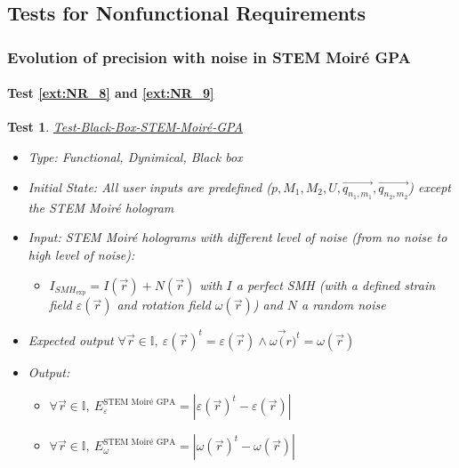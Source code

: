 \documentclass[12pt, titlepage]{article}
\newcommand{\progname}{STEM Moir{\'e} GPA}
\newtheorem{Test}{Test}
\begin{document}
\subsection{Tests for Nonfunctional Requirements}

\subsubsection{Evolution of precision with noise in \progname{}}
		
\paragraph{Test \cref{ext:NR_8} and \cref{ext:NR_9}}						

\begin{Test}\normalfont\underline{Test-Black-Box-STEM-Moir{\'e}-GPA}
\label{black_box_STEM_Moire_GPA}
\begin{itemize}
\item Type: Functional, Dynimical, Black box
\item Initial State: All user inputs are predefined ($p,M_1,M_2,U,\overrightarrow{q_{n_1,m_1}},\overrightarrow{q_{n_2,m_2}}$) except the STEM Moir{\'e} hologram
\item Input: STEM Moir{\'e} holograms with different level of noise (from no noise to high level of noise): 
	\begin{itemize}
	\item	$I_{\mathit{SMH}_\text{exp}} = I(\vec{r}) + N(\vec{r})$ with $I$ a perfect SMH (with a defined strain field $\varepsilon(\vec{r})$ and rotation field $\omega(\vec{r})$) and $N$ a random noise
	\end{itemize}
\item Expected output $\forall \vec{r} \in \mathbb{I}, \ \varepsilon(\vec{r})^{t}=\varepsilon(\vec{r}) \wedge \omega\vec({r})^{t}=\omega(\vec{r})$
\item Output:
	\begin{itemize}
	\item $\forall \vec{r} \in \mathbb{I}, \ E^{\text{\progname{}}}_{\varepsilon}=|\varepsilon(\vec{r})^{t}-\varepsilon(\vec{r})|$
	\item $\forall \vec{r} \in \mathbb{I}, \ E^{\text{\progname{}}}_{\omega}=|\omega(\vec{r})^{t}-\omega(\vec{r})|$
	\end{itemize}
\end{itemize}
\end{Test}
\end{document}
